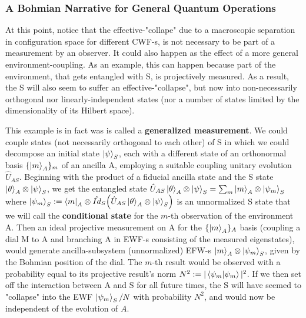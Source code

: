 \documentclass[11pt, a4paper]{article} %
\begin{document}
\subsubsection*{A Bohmian Narrative for General Quantum Operations}
At this point, notice that the effective-"collape" due to a macroscopic separation in configuration space for different CWF-s, is not necessary to be part of a measurement by an observer. It could also happen as the effect of a more general environment-coupling. 
As an example, this can happen because part of the environment, that gets entangled with S, is projectively measured. As a result, the S will also seem to suffer an effective-"collapse", but now into non-necessarily orthogonal nor linearly-independent states (nor a number of states limited by the dimensionality of its Hilbert space). 

This example is in fact was is called a {\bf generalized measurement}. We could couple states (not necessarily orthogonal to each other) of S in which we could decompose an initial state $\ket{\psi}_S$, each with a different state of an orthonormal basis $\{\ket{m}_A\}_m$ of an ancilla A, employing a suitable coupling unitary evolution $\hat{U}_{AS}$. Beginning with the product of a fiducial ancilla state and the S state $\ket{\theta}_A\otimes\ket{\psi}_S$, we get the entangled state $\hat{U}_{AS}\ket{\theta}_A\otimes\ket{\psi}_S=\sum_m \ket{m}_A\otimes \ket{\psi_m}_S$ where $\ket{\psi_m}_S:=\bra{m}_A\otimes\hat{Id}_S \qty(\hat{U}_{AS}\ket{\theta}_A\otimes\ket{\psi}_S)$ is an unnormalized S state that we will call the {\bf conditional state} for the $m$-th observation of the environment A. Then an ideal projective measurement on A for the $\{\ket{m}_A\}_A$ basis (coupling a dial M to A and branching A in EWF-s consisting of the measured eigenstates), would generate ancilla-subsystem (unnormalized) EFW-s $\ket{m}_A\otimes \ket{\psi_m}_S$, given by the Bohmian position of the dial. The $m$-th result would be observed with a probability equal to its projective result's norm $N^2:=|\bra{\psi_m}\ket{\psi_m}|^2$. If we then set off the interaction between A and S for all future times, the S will have seemed to "collapse" into the EWF $\ket{\psi_m}_S/N$ with probability $N^2$, and would now be independent of the evolution of $A$.
\end{document}
